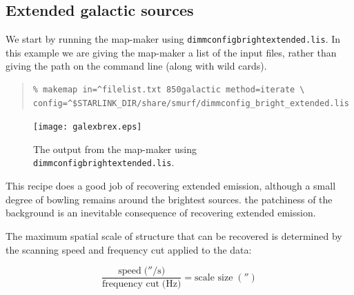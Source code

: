 \documentclass[twoside,11pt]{article}
\newcounter{box}
\newcommand{\xref}[3]{#1}
\newcommand{\xlabel}[1]{}
\renewcommand{\_}{\texttt{\symbol{95}}}
\newenvironment{myquote}{\begin{quote}\begin{small}}{\end{small}\end{quote}}
\newcommand{\cupid}{\xref{\textsc{Cupid}}{sun255}{}}
\newcommand{\picard}{\xref{\textsc{Picard}}{sun231}{}}
\newcommand{\drrecipe}[1]{\texttt{#1}}
\newcommand{\task}[1]{\textsf{#1}}
\newcommand{\param}[1]{\texttt{#1}}
\newcommand{\findback}{\xref{\task{findback}}{sun255}{FINDBACK}}
\begin{document}
\subsection{\xlabel{Galactic}Extended galactic sources}
\label{sec:bright_ex}

We start by running the map-maker using \texttt{dimmconfig\_bright\_extended.lis}. In this example we are giving the map-maker a list of the input files, rather than giving the path on the command line (along with wild cards). 

\begin{myquote}
\begin{verbatim}
% makemap in=^filelist.txt 850galactic method=iterate \
config=^$STARLINK_DIR/share/smurf/dimmconfig_bright_extended.lis
\end{verbatim}
\end{myquote}

\begin{figure}[t!]
\begin{center}
\texttt{[image: galex\_brex.eps]}
\caption{\small The output from the map-maker using \texttt{dimmconfig\_bright\_extended.lis}.}
\label{fig:galmakemap}
\end{center}
\end{figure}


This recipe does a good job of recovering extended emission, although a small degree of bowling remains around the brightest sources. the patchiness of the background is an inevitable consequence of recovering extended emission.

The maximum spatial scale of structure that can be recovered is determined by the scanning speed and frequency cut applied to the data:

\begin{equation}
\frac{\mbox{speed}\;(''/\mbox{s)}}{\mbox{frequency cut}\;(\mbox{Hz)}}=\mbox{scale size}\;('')
\end{equation}
\end{document}
